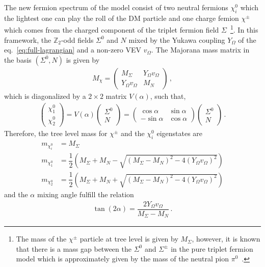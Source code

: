 \documentclass[12pt,letterpaper]{article}
\begin{document}
The new fermion spectrum of the model consist of two neutral fermions $\chi_i^0$ which the lightest one can play the roll of the DM particle and one charge femion $\chi^{\pm}$ which comes from the charged component of the triplet fermion field $\Sigma$~\footnote{The mass of the $\chi^{\pm}$ particle at tree level is given by $M_{\Sigma}$, however, it is known that there is a mass gap between the $\Sigma^0$ and $\Sigma^{\pm}$ in the pure triplet fermion model which is approximately given by the mass of the neutral pion $\pi^0$~\cite{Cirelli:2005uq, Choubey:2017yyn}.}. In this framework, the $\mathbb{Z}_2$-odd fields $\Sigma^0$ and $N$ mixed by the Yukawa coupling $Y_{\Omega}$ of the eq.~\ref{eq:full-lagrangian} and a non-zero VEV $v_{\Omega}$. The Majorana mass matrix in the basis $(\Sigma^0, N)$ is given by
%
\begin{align}
\label{eq:M-chi-matrix}
M_{\chi}=
\begin{pmatrix}
M_{\Sigma} & Y_{\Omega}v_{\Omega} \\
Y_{\Omega}v_{\Omega} & M_N
\end{pmatrix}\,,
\end{align}
%
which is diagonalized by a $2\times2$ matrix $V(\alpha)$, such that,
%
\begin{align}
\label{eq:M-chi-rotation}
\begin{pmatrix}
\chi_1^0 \\
\chi_2^0
\end{pmatrix}=
V(\alpha)
\begin{pmatrix}
\Sigma^0 \\
N
\end{pmatrix}
=
\begin{pmatrix}
\cos\alpha & \sin\alpha \\
-\sin\alpha & \cos\alpha
\end{pmatrix}
\begin{pmatrix}
\Sigma^0 \\
N
\end{pmatrix}\,.
\end{align}
%
Therefore, the tree level mass for $\chi^{\pm}$ and the $\chi^0_i$ eigenstates are
%
\begin{align}
m_{\chi_i^0} &= M_\Sigma \nonumber \\
m_{\chi_1^0} &= \dfrac{1}{2}\left(M_\Sigma + M_N - \sqrt{(M_\Sigma - M_N)^2-4(Y_{\Omega}v_{\Omega})^2} \right)\nonumber \\
\label{eq:chi-masses}
m_{\chi_2^0} &= \dfrac{1}{2}\left(M_\Sigma + M_N + \sqrt{(M_\Sigma - M_N)^2-4(Y_{\Omega}v_{\Omega})^2} \right)
\end{align}
and the $\alpha$ mixing angle fulfill the relation
\begin{align}
\label{eq:tan-alpha}
\tan(2\alpha)= \dfrac{2Y_{\Omega}v_\Omega}{M_{\Sigma}-M_N}\,.
\end{align}
\end{document}
